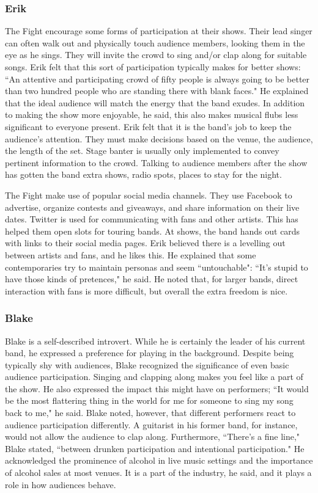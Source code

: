 \subsubsection{Erik}
The Fight encourage some forms of participation at their shows. Their lead singer can often walk out and physically touch audience members, looking them in the eye as he sings. They will invite the crowd to sing and/or clap along for suitable songs. Erik felt that this sort of participation typically makes for better shows: ``An attentive and participating crowd of fifty people is always going to be better than two hundred people who are standing there with blank faces." He explained that the ideal audience will match the energy that the band exudes. In addition to making the show more enjoyable, he said, this also makes musical flubs less significant to everyone present. Erik felt that it is the band's job to keep the audience's attention. They must make decisions based on the venue, the audience, the length of the set. Stage banter is usually only implemented to convey pertinent information to the crowd. Talking to audience members after the show has gotten the band extra shows, radio spots, places to stay for the night.

The Fight make use of popular social media channels. They use Facebook to advertise, organize contests and giveaways, and share information on their live dates. Twitter is used for communicating with fans and other artists. This has helped them open slots for touring bands. At shows, the band hands out cards with links to their social media pages. Erik believed there is a levelling out between artists and fans, and he likes this. He explained that some contemporaries try to maintain personas and seem ``untouchable": ``It's stupid to have those kinds of pretences," he said. He noted that, for larger bands, direct interaction with fans is more difficult, but overall the extra freedom is nice.

\subsubsection{Blake}
Blake is a self-described introvert. While he is certainly the leader of his current band, he expressed a preference for playing in the background. Despite being typically shy with audiences, Blake recognized the significance of even basic audience participation. Singing and clapping along makes you feel like a part of the show. He also expressed the impact this might have on performers; ``It would be the most flattering thing in the world for me for someone to sing my song back to me," he said. Blake noted, however, that different performers react to audience participation differently. A guitarist in his former band, for instance, would not allow the audience to clap along. Furthermore, ``There's a fine line," Blake stated, ``between drunken participation and intentional participation." He acknowledged the prominence of alcohol in live music settings and the importance of alcohol sales at most venues. It is a part of the industry, he said, and it plays a role in how audiences behave.

